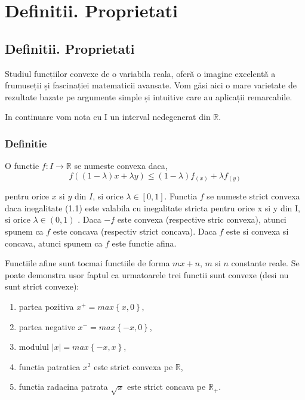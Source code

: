 \documentclass[a4paper,12pt,oneside]{report}
\begin{document}
\maketitle

\tableofcontents

%
%
%
%
\chapter{Definitii. Proprietati}

\section{Definitii. Proprietati}

Studiul funcțiilor convexe de o variabila reala, oferă o imagine excelentă a frumuseții și fascinației matematicii avansate. Vom găsi aici o mare varietate de rezultate bazate pe argumente simple și intuitive care au aplicații remarcabile.

In continuare vom nota cu I un interval nedegenerat din \(\mathbb{R}\).

\subsection{Definitie}

O functie \(f: I \rightarrow \mathbb{R}\) se numeste convexa daca,
\begin{displaymath}
f \left ( \left ( 1 - \lambda  \right )x + \lambda y \right )\leq \left ( 1 - \lambda  \right ) f_{\left ( x \right )} + \lambda f_{\left ( y \right )} 	\label{eq:1.1} \tag{1.1}
\end{displaymath}

pentru orice \(x\) si \(y\) din \(I\), si orice \(\lambda \in \left [ 0,1 \right ]\). Functia \(f\) se numeste strict convexa daca inegalitate (1.1) este valabila cu inegalitate stricta pentru orice x si y din I, si orice  \(\lambda \in \left ( 0,1 \right )\) . Daca \(-f\) este convexa (respective stric convexa), atunci spunem ca \(f\) este concava (respectiv strict concava). Daca \(f\) este si convexa si concava, atunci spunem ca \(f\) este functie afina. 


Functiile afine sunt tocmai functiile de forma \(mx + n\),  \(m\) si \(n\) constante reale.
Se poate demonstra usor faptul ca urmatoarele trei functii sunt convexe (desi nu sunt strict convexe):
\begin{enumerate}
  \item partea pozitiva \(x^{+} = max \left \{ x,0 \right \}\),
  \item partea negative \(x^{-} = max \left \{ -x,0 \right \}\), 
  \item modulul \(\left | x \right | = max \left \{ -x,x \right \}\),
  \item functia patratica \(x^{2}\)  este strict convexa pe \(\mathbb{R}\),
  \item functia radacina patrata \(\sqrt{x}\) este strict concava pe \(\mathbb{R}_{+}\). 
\end{enumerate}
\end{document}
